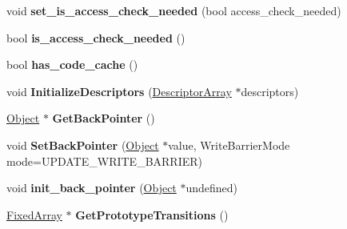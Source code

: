 \begin{DoxyCompactItemize}
\item 
\hypertarget{classv8_1_1internal_1_1_map_a1b5ae7473b107ba16b5305aacd5159e0}{}void {\bfseries set\+\_\+is\+\_\+access\+\_\+check\+\_\+needed} (bool access\+\_\+check\+\_\+needed)\label{classv8_1_1internal_1_1_map_a1b5ae7473b107ba16b5305aacd5159e0}

\item 
\hypertarget{classv8_1_1internal_1_1_map_a1d2b5259a72590db05e7a5535d678472}{}bool {\bfseries is\+\_\+access\+\_\+check\+\_\+needed} ()\label{classv8_1_1internal_1_1_map_a1d2b5259a72590db05e7a5535d678472}

\item 
\hypertarget{classv8_1_1internal_1_1_map_ac483ffddad675d6ed95fb4e291d2fabf}{}bool {\bfseries has\+\_\+code\+\_\+cache} ()\label{classv8_1_1internal_1_1_map_ac483ffddad675d6ed95fb4e291d2fabf}

\item 
\hypertarget{classv8_1_1internal_1_1_map_a7ad784b52044d21a5434e1340eee48a2}{}void {\bfseries Initialize\+Descriptors} (\hyperlink{classv8_1_1internal_1_1_descriptor_array}{Descriptor\+Array} $\ast$descriptors)\label{classv8_1_1internal_1_1_map_a7ad784b52044d21a5434e1340eee48a2}

\item 
\hypertarget{classv8_1_1internal_1_1_map_a1c3bf83707827c566115ec0c80bfc1ed}{}\hyperlink{classv8_1_1internal_1_1_object}{Object} $\ast$ {\bfseries Get\+Back\+Pointer} ()\label{classv8_1_1internal_1_1_map_a1c3bf83707827c566115ec0c80bfc1ed}

\item 
\hypertarget{classv8_1_1internal_1_1_map_a50e304739b2086469cde853b8f50c6dd}{}void {\bfseries Set\+Back\+Pointer} (\hyperlink{classv8_1_1internal_1_1_object}{Object} $\ast$value, Write\+Barrier\+Mode mode=U\+P\+D\+A\+T\+E\+\_\+\+W\+R\+I\+T\+E\+\_\+\+B\+A\+R\+R\+I\+E\+R)\label{classv8_1_1internal_1_1_map_a50e304739b2086469cde853b8f50c6dd}

\item 
\hypertarget{classv8_1_1internal_1_1_map_ad45d23d12ac0119e8fdfb373d644652d}{}void {\bfseries init\+\_\+back\+\_\+pointer} (\hyperlink{classv8_1_1internal_1_1_object}{Object} $\ast$undefined)\label{classv8_1_1internal_1_1_map_ad45d23d12ac0119e8fdfb373d644652d}

\item 
\hypertarget{classv8_1_1internal_1_1_map_a101795a923541f738729323f7df352c4}{}\hyperlink{classv8_1_1internal_1_1_fixed_array}{Fixed\+Array} $\ast$ {\bfseries Get\+Prototype\+Transitions} ()\label{classv8_1_1internal_1_1_map_a101795a923541f738729323f7df352c4}


\end{DoxyCompactItemize}
